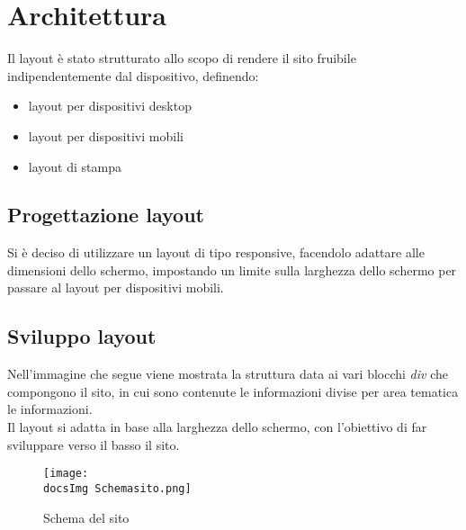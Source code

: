 \section{Architettura}{
	Il layout è stato strutturato allo scopo di rendere il sito fruibile indipendentemente dal dispositivo, definendo:
	\begin{itemize}\itemsep1pt
		\item layout per dispositivi desktop
		\item layout per dispositivi mobili
		\item layout di stampa
	\end{itemize} 
	
	\subsection{Progettazione layout}{
		Si è deciso di utilizzare un layout di tipo responsive, facendolo adattare alle dimensioni dello schermo, impostando un limite sulla larghezza dello schermo per passare al layout per dispositivi mobili.
	}
	\subsection{Sviluppo layout}{
		Nell'immagine che segue viene mostrata la struttura data ai vari blocchi \textit{div} che compongono il sito, in cui sono contenute le informazioni divise per area tematica le informazioni.
	\\
	Il layout si adatta in base alla larghezza dello schermo, con l'obiettivo di far sviluppare verso il basso il sito.
		\begin{figure}[H]
			\texttt{[image: \\docsImg Schemasito.png]}
			\caption{Schema del sito}
			\label{Schema del sito}
		\end{figure}
		
}}
